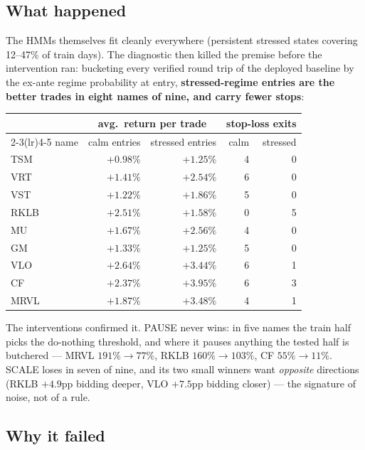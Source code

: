 \documentclass[11pt,a4paper]{article}
\begin{document}
\subsection{What happened}

The HMMs themselves fit cleanly everywhere (persistent stressed states covering
12--47\% of train days). The diagnostic then killed the premise before the
intervention ran: bucketing every verified round trip of the deployed baseline by
the ex-ante regime probability at entry, \textbf{stressed-regime entries are the
better trades in eight names of nine, and carry fewer stops}:

\begin{center}
\begin{tabular}{lrrrr}
\toprule
 & \multicolumn{2}{c}{avg.\ return per trade} & \multicolumn{2}{c}{stop-loss exits} \\
\cmidrule(lr){2-3}\cmidrule(lr){4-5}
name & calm entries & stressed entries & calm & stressed \\
\midrule
TSM  & $+0.98\%$ & $+1.25\%$ & 4 & 0 \\
VRT  & $+1.41\%$ & $+2.54\%$ & 6 & 0 \\
VST  & $+1.22\%$ & $+1.86\%$ & 5 & 0 \\
RKLB & $+2.51\%$ & $+1.58\%$ & 0 & 5 \\
MU   & $+1.67\%$ & $+2.56\%$ & 4 & 0 \\
GM   & $+1.33\%$ & $+1.25\%$ & 5 & 0 \\
VLO  & $+2.64\%$ & $+3.44\%$ & 6 & 1 \\
CF   & $+2.37\%$ & $+3.95\%$ & 6 & 3 \\
MRVL & $+1.87\%$ & $+3.48\%$ & 4 & 1 \\
\bottomrule
\end{tabular}
\end{center}

The interventions confirmed it. PAUSE never wins: in five names the train half
picks the do-nothing threshold, and where it pauses anything the tested half is
butchered --- MRVL $191\% \rightarrow 77\%$, RKLB $160\% \rightarrow 103\%$, CF
$55\% \rightarrow 11\%$. SCALE loses in seven of nine, and its two small winners
want \emph{opposite} directions (RKLB $+4.9$pp bidding deeper, VLO $+7.5$pp
bidding closer) --- the signature of noise, not of a rule.

\subsection{Why it failed}
\end{document}
